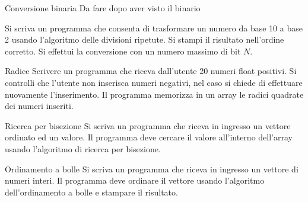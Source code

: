 \documentclass[aspectratio=169, ]{beamer}
\begin{document}
\begin{frame}{Conversione binaria}
    \alert{Da fare dopo aver visto il binario}

Si scriva un programma che consenta di trasformare un numero da base 10 a base 2 usando l'algoritmo delle divisioni ripetute. Si stampi il risultato nell'ordine corretto. Si effettui la conversione con un numero massimo di bit $N$.
\end{frame}

\begin{frame}{Radice}
Scrivere un programma che riceva dall'utente 20 numeri float positivi.
Si controlli che l'utente non inserisca numeri negativi, nel caso si chiede di effettuare nuovamente l'inserimento.
Il programma memorizza in un array le radici quadrate dei numeri inseriti.
\end{frame}

\begin{frame}{Ricerca per bisezione}
Si scriva un programma che riceva in ingresso un vettore ordinato ed un valore.
Il programma deve cercare il valore all'interno dell'array usando l'algoritmo di ricerca per bisezione.
\end{frame}

\begin{frame}{Ordinamento a bolle}
Si scriva un programma che riceva in ingresso un vettore di numeri interi.
Il programma deve ordinare il vettore usando l'algoritmo dell'ordinamento a bolle e stampare il risultato.
\end{frame}
\end{document}

